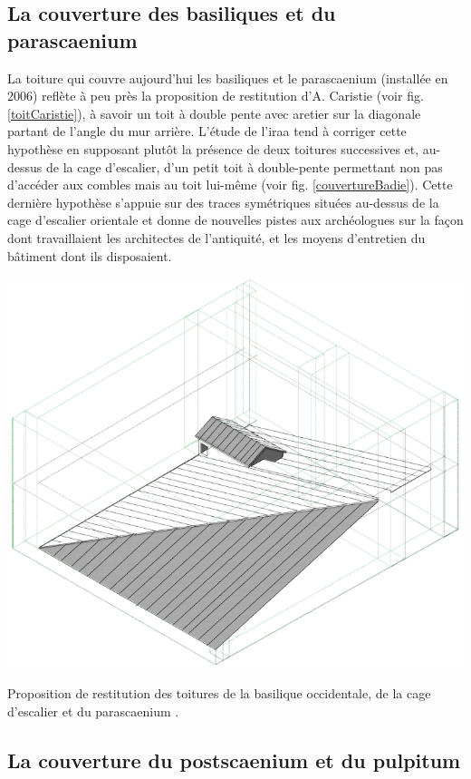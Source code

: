 	\subsection{La couverture des \glspl{basilique} et du \gls{parascaenium}}
	\label{couverture-basi}
		
		La toiture qui couvre aujourd'hui les \glspl{basilique} et le \gls{parascaenium} (installée en 2006) reflète à peu près la proposition de restitution d'A. Caristie (voir fig. \ref{toitCaristie}), à savoir un toit à double pente avec \gls{aretier} sur la diagonale partant de l'angle du mur arrière. L'étude de l'\gls{iraa} \cite[p. 36]{orangeTxt} tend à corriger cette hypothèse en supposant plutôt la présence de deux toitures successives et, au-dessus de la cage d’escalier, d’un petit toit à double-pente permettant non pas d’accéder aux combles mais au toit lui-même (voir fig. \ref{couvertureBadie}). Cette dernière hypothèse s'appuie sur des traces symétriques situées au-dessus de la cage d’escalier orientale et donne de nouvelles pistes aux archéologues sur la façon dont travaillaient les architectes de l'antiquité, et les moyens d'entretien du bâtiment dont ils disposaient. 
		
		\begin{figureth}
			\includegraphics[width=0.7\linewidth]{images/couvertureBadie}
			\caption[Toitures de basiliques par A.Badie]{Proposition de restitution des toitures de la \gls{basilique} occidentale, de la cage d'escalier et du \gls{parascaenium} \footnotemark.}
			\label{couvertureBadie}
		\end{figureth}	
		
		\subsection{La couverture du \gls{postscaenium} et du \gls{pulpitum}} \label{couverture}
		
